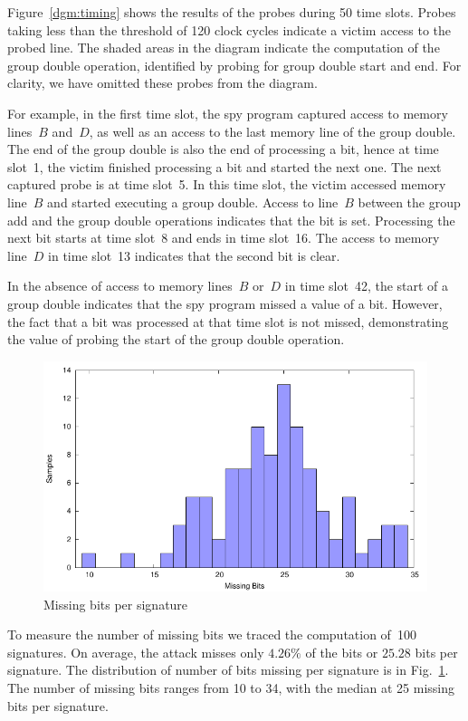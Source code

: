 \documentclass[twocolumn]{svjour3}
\begin{document}
Figure~\ref{dgm:timing} shows the results of the probes during 50 time slots.
Probes taking less than the threshold of 120 clock cycles indicate a victim access to the probed line.
The shaded areas in the diagram indicate the computation of the group double operation, identified
by probing for group double start and end.
For clarity, we have omitted these probes from the diagram.


For example, in the first time slot, the spy program captured access to memory lines~$B$ and~$D$, as well as an access
to the last memory line of the group double.
The end of the group double is also the end of processing a bit, hence at time slot~1, the victim finished processing a bit
and started the next one.
The next captured probe is at time slot~5.
In this time slot, the victim accessed memory line~$B$ and started executing a group double.  
Access to line~$B$ between the group add and the group double operations indicates that the bit is set.
Processing the next bit starts at time slot~8 and ends in time slot~16.
The access to memory line~$D$ in time slot~13 indicates that the second bit is clear.

In the absence of access to memory lines~$B$ or~$D$ in time slot~42, the start of a group double indicates
that the spy program missed a value of a bit.
However, the fact that a bit was processed at that time slot is not missed,
demonstrating the value of probing the start of the group double operation.

\begin{figure}[htb]
\includegraphics[width=\columnwidth]{missing}
\caption{Missing bits per signature\label{dgm:dist}}
\end{figure}

To measure the number of missing bits we traced the computation of~100 signatures.
On average, the attack misses only $4.26\%$ of the bits or $25.28$ bits per signature.
The distribution of number of bits missing per signature is in Fig.~\ref{dgm:dist}.
The number of missing bits ranges from 10 to 34, with the median at 25 missing bits per signature.
\end{document}
